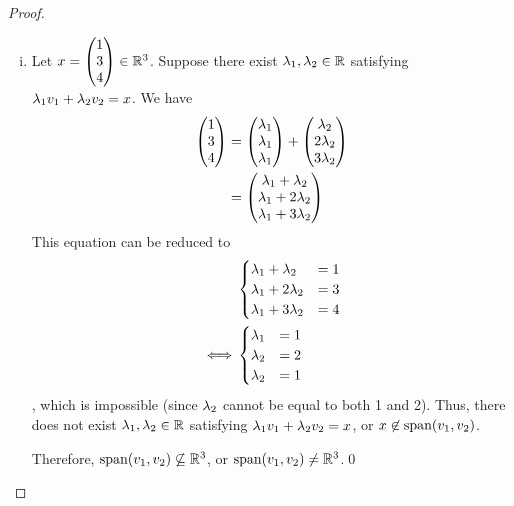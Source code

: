 \begin{proof}
\begin{enumerate}[(i)]
        From Theorem 2.7 in LADR section 2A, it follows that $\SpanLA(v_1,v_2,v_3)$ is a subspace of $\R^3$, or $\SpanLA(v_1,v_2,v_3)\subseteq\R^3$ (1).

        Conversely, let $x=\ColVecThree{x_1}{x_2}{x_3}\in\R^3$, where $x_1,x_2,x_3\in\R$. Let $\lam_1=x_2-x_3+x_1,\lam_2=\frac{x_3-x_1}{2},\lam_3=\frac{x_1-2x_2+x_3}{2}$. Then,
        \[
            \begin{aligned}
                \lam_1v_1+\lam_2v_2+\lam_3v_3 &= (x_2-x_3+x_1)\ColVecThree{1}{1}{1}+\frac{x_3-x_1}{2}\ColVecThree{1}{2}{3}+\frac{x_1-2x_2+x_3}{2}\ColVecThree{1}{0}{1}\\
                                              &= \ColVecThree{x_2-x_3+x_1+\frac{x_3-x_1}{2}+\frac{x_1+x_3}{2}-x_2}{x_2-x_3+x_1+x_3-x_1}{x_2-x_3+x_1+\frac{3(x_3-x_1)}{2}+\frac{x_1+x_3}{2}-x_2}\\
                                              &= \ColVecThree{x_1}{x_2}{x_3}=x
            \end{aligned}  
        \]
        Thus, $x\in\SpanLA(v_1,v_2,v_3)$, or $\R^3\subseteq\SpanLA(v_1,v_2,v_3)$ (2). Therefore, from (1) and (2), it follows that $\R^3=\SpanLA(v_1,v_2,v_3)$.\qed
        \item Let $x=\begin{pmatrix} 1\\ 3\\ 4\end{pmatrix}\in\mathbb R^3$. Suppose there exist $\lambda_1,\lambda_2\in\mathbb R$ satisfying $\lambda_1v_1+\lambda_2v_2=x$. We have
        \[
            \begin{aligned}
                \begin{pmatrix} 1\\ 3\\ 4\end{pmatrix} &= \begin{pmatrix} \lambda_1\\ \lambda_1\\ \lambda_1\end{pmatrix}+\begin{pmatrix} \lambda_2\\ 2\lambda_2\\ 3\lambda_2\end{pmatrix}\\
                                      &= \begin{pmatrix} \lambda_1+\lambda_2\\ \lambda_1+2\lambda_2\\ \lambda_1+3\lambda_2\end{pmatrix}
            \end{aligned}  
        \]
        This equation can be reduced to
        \begin{align*}
            &\begin{cases}
                \lambda_1+\lambda_2  &= 1\\
                \lambda_1+2\lambda_2 &= 3\\
                \lambda_1+3\lambda_2 &= 4
            \end{cases}\\\iff
            &\begin{cases}
                \lambda_1         &= 1\\
                \lambda_2         &= 2\\
                \lambda_2         &= 1
            \end{cases}
        \end{align*}
        , which is impossible (since $\lambda_2$ cannot be equal to both 1 and 2). Thus, there does not exist $\lambda_1,\lambda_2\in\mathbb R$ satisfying $\lambda_1v_1+\lambda_2v_2=x$, or $x\not\in\textnormal{span}(v_1,v_2)$. 
        
        Therefore, $\textnormal{span}(v_1,v_2)\not\subseteq\mathbb R^3$, or $\textnormal{span}(v_1,v_2)\not=\mathbb R^3$.\qed
    \end{enumerate}
\end{proof}